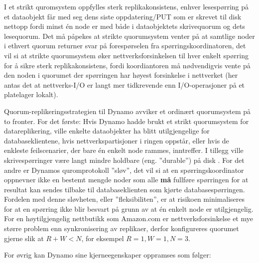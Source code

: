 I et strikt quromsystem oppfylles sterk replikakonsistens, enhver lesespørring på et dataobjekt får med seg dens siste oppdatering/PUT som er skrevet til disk nettopp fordi minst én node er med både i dataobjektets skrivequorum og dets lesequorum. Det må påpekes at strikte quorumsystem venter på at samtlige noder i ethvert quorum returner svar på forespørselen fra spørringskoordinatoren, det vil si at strikte quorumsystem øker nettverksforsinkelsen til hver enkelt spørring for å sikre sterk replikakonsistens, fordi koordiantoren må nødvendigvis vente på den noden i quorumet der spørringen har høyest forsinkelse i nettverket (her antas det at nettverks-I/O er langt mer tidkrevende enn I/O-operasjoner på et platelager lokalt).

Quorum-replikeringsstrategien til Dynamo avviker et ordinært quorumsystem på to fronter. For det første: Hvis Dynamo hadde brukt et strikt quorumsystem for datareplikering, ville enkelte dataobjekter ha blitt utilgjengelige for databaseklientene, hvis nettverkspartisjoner i ringen oppstår, eller hvis de enkleste feilscenarier, der bare én enkelt node rammes, inntreffer. I tillegg ville skrivespørringer være langt mindre holdbare (eng. ''durable'') på disk \citep{decandia2007}. For det andre er Dynamos quromprotokoll ''sløv'', det vil si at en spørringskoordinator oppnevner ikke en bestemt mengde noder som alle \textbf{må} fullføre spørringen for at resultat kan sendes tilbake til databaseklienten som kjørte databasespørringen. Fordelen med denne sløvheten, eller ''fleksibiliten'', er at risikoen minimaliseres for at en spørring ikke blir besvart på grunn av at én enkelt node er utilgjengelig. For en høytilgjengelig nettbutikk som Amazon.com er nettverksforsinkelse et mye større problem enn synkronisering av replikaer, derfor konfigureres quorumet gjerne slik at \(R + W < N\), for eksempel \(R = 1, W =1, N = 3\).

For øvrig kan Dynamo sine kjerneegenskaper oppramses som følger:

